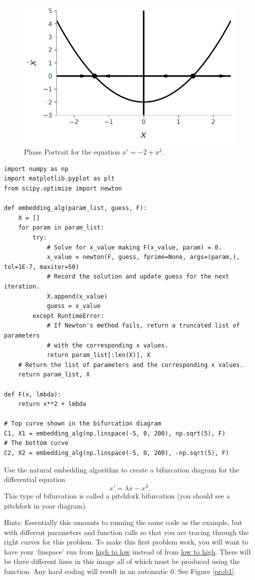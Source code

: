 \begin{figure}
\centering
\includegraphics[width=\textwidth]{figures/SaddleNPhasePortrait.pdf}
\caption{Phase Portrait for the equation $x' = -2 + x^2$.}
\label{phaseportrait:sn}
\end{figure}

\newpage
\begin{lstlisting}
import numpy as np
import matplotlib.pyplot as plt
from scipy.optimize import newton

def embedding_alg(param_list, guess, F):
    X = []
    for param in param_list:
        try:
            # Solve for x_value making F(x_value, param) = 0.
            x_value = newton(F, guess, fprime=None, args=(param,), tol=1E-7, maxiter=50)
            # Record the solution and update guess for the next iteration.
            X.append(x_value)
            guess = x_value
        except RuntimeError:
            # If Newton's method fails, return a truncated list of parameters
            # with the corresponding x values.
            return param_list[:len(X)], X
    # Return the list of parameters and the corresponding x values.
    return param_list, X

def F(x, lmbda):
    return x**2 + lmbda

# Top curve shown in the bifurcation diagram
C1, X1 = embedding_alg(np.linspace(-5, 0, 200), np.sqrt(5), F)
# The bottom curve
C2, X2 = embedding_alg(np.linspace(-5, 0, 200), -np.sqrt(5), F)
\end{lstlisting}

\begin{problem}
Use the natural embedding algorithm to create a bifurcation diagram for the differential equation
\[x' = \lambda x-x^3.\]
This type of bifurcation is called a pitchfork bifurcation (you should see a pitchfork in your diagram).

Hints: Essentially this amounts to running the same code as the example, but with different parameters and function calls so that you are tracing through the right curves for this problem.
To make this first problem work, you will want to have your `linspace' run from \underline{high to low} instead of from \underline{low to high}.
There will be three different lines in this image all of which must be produced using the  function. Any hard coding will result in an automatic 0.
See Figure \ref{prob1}.
\end{problem}

